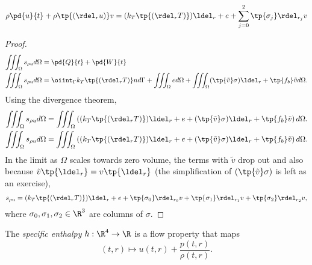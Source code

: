 \begin{thm}
\begin{equation}
    \rho \pd{u}{t} + \rho \tp{(\rdel_r u )} v  = (k_T \tp{\left( \rdel_r T\right)} ) \ldel_r + e + \sum_{j=0}^2 \tp{\sigma_j} \rdel_{r_j} v
\end{equation}
\end{thm}
\begin{proof}
\begin{align}
    \iiint_\Omega s_{\rho u} d\Omega &= \pd{Q}{t} + \pd{W}{t} \\
    \iiint_\Omega s_{\rho u} d\Omega &= 
        \oiint_\Gamma k_T \tp{\left( \rdel_r T\right)} n d\Gamma + \iiint_\Omega e d\Omega +
        \iiint_\Omega (\tp{\tilde{v}} \sigma) \ldel_r + \tp{f_b} \tilde{v} d\Omega.
\end{align}
Using the divergence theorem,
\begin{align}
    \iiint_\Omega s_{\rho u} d\Omega &= 
        \iiint_\Omega \left( (k_T \tp{\left( \rdel_r T\right)} ) \ldel_r + e +
        (\tp{\tilde{v}} \sigma) \ldel_r + \tp{f_b} \tilde{v} \right) d\Omega. \\
    \iiint_\Omega s_{\rho u} d\Omega &= 
        \iiint_\Omega \left( (k_T \tp{\left( \rdel_r T\right)} ) \ldel_r + e +
        (\tp{\tilde{v}} \sigma) \ldel_r + \tp{f_b} \tilde{v} \right) d\Omega.
\end{align}
In the limit as $\Omega$ scales towards zero volume, the terms with $\tilde{v}$ drop out
and also because $\tilde{v}\tp{\ldel_r} = v\tp{\ldel_r}$ (the simplification of $(\tp{\tilde{v}}\sigma)$
is left as an exercise),
\begin{align}
    s_{\rho u} = (k_T \tp{\left( \rdel_r T\right)} ) \ldel_r + e +
        \tp{\sigma_0} \rdel_{r_0} v + \tp{\sigma_1} \rdel_{r_1} v + \tp{\sigma_2} \rdel_{r_2} v, \\
\end{align}
where $\sigma_0, \sigma_1, \sigma_2 \in \R^3$ are columns of $\sigma$.

\end{proof}


\begin{df}
The \emph{specific enthalpy} $h:\R^4\to \R$ is a flow property that maps
    \begin{equation}
        (t,r) \mapsto u(t,r) + \frac{p(t,r)}{\rho(t,r)}.
    \end{equation}
\end{df}

